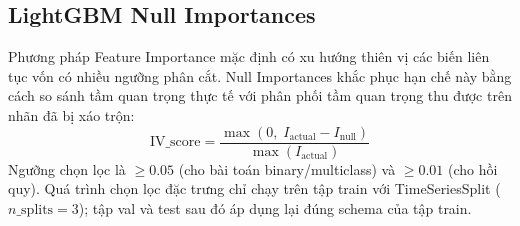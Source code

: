 \documentclass[conference]{IEEEtran}
\begin{document}
\subsection{LightGBM Null Importances}
Phương pháp Feature Importance mặc định có xu hướng thiên vị các biến liên
tục vốn có nhiều ngưỡng phân cắt. Null Importances khắc phục hạn chế này bằng
cách so sánh tầm quan trọng thực tế với phân phối tầm quan trọng thu được
trên nhãn đã bị xáo trộn:
\begin{equation}
\text{IV\_score} = \frac{\max(0,\; I_\text{actual} - I_\text{null})}
                       {\max(I_\text{actual})}
\label{eq:ivscore}
\end{equation}
Ngưỡng chọn lọc là $\geq 0.05$ (cho bài toán binary/multiclass) và
$\geq 0.01$ (cho hồi quy). Quá trình chọn lọc đặc trưng chỉ chạy trên tập
train với TimeSeriesSplit ($n\_\text{splits}=3$); tập val và test sau đó áp
dụng lại đúng schema của tập train.
\end{document}
